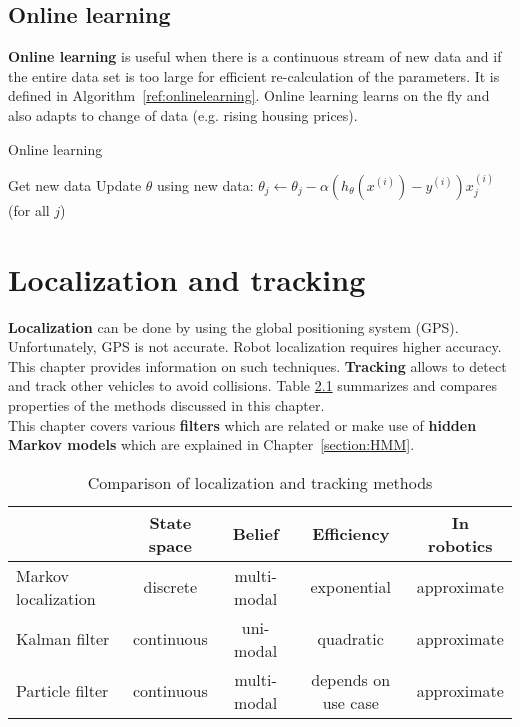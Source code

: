 \documentclass{report}
\begin{document}
\section{Online learning}
{\bf Online learning} is useful when there is a continuous stream of new data and if the entire data set is too large for efficient re-calculation of the parameters. It is defined in Algorithm~\ref{ref:onlinelearning}. Online learning learns on the fly and also adapts to change of data (e.g. rising housing prices).

\begin{algorithm}
\caption{Online learning}
\label{ref:onlinelearning}
\begin{algorithmic}
\State Get new data
\Repeat
\State Update $\theta$ using new data: $\theta_j\gets \theta_j - \alpha (h_\theta(x^{(i)})-y^{(i)})x_j^{(i)}$ (for all $j$)
\end{algorithmic}
\end{algorithm}


\chapter{Localization and tracking}
\label{chapter:localizationandtracking}
{\bf Localization} can be done by using the global positioning system (GPS). Unfortunately, GPS is not accurate. Robot localization requires higher accuracy. This chapter provides information on such techniques.
{\bf Tracking} allows to detect and track other vehicles to avoid collisions.
Table \ref{ref:complocalization} summarizes and compares properties of the methods discussed in this chapter. \\
This chapter covers various {\bf filters} which are related or make use of {\bf hidden Markov models} which are explained in Chapter~\ref{section:HMM}.
\begin{table}[h!]
\begin{center}
\begin{tabular}{l||c|c|c|c}
 & State space & Belief & Efficiency & In robotics \\
\hline
\hline
Markov localization & discrete & multi-modal & exponential & approximate \\
\hline
Kalman filter & continuous & uni-modal & quadratic & approximate \\
\hline
Particle filter & continuous & multi-modal & depends on use case & approximate \\

\end{tabular}
\end{center}
\caption{Comparison of localization and tracking methods}
\label{ref:complocalization}
\end{table}
\end{document}
